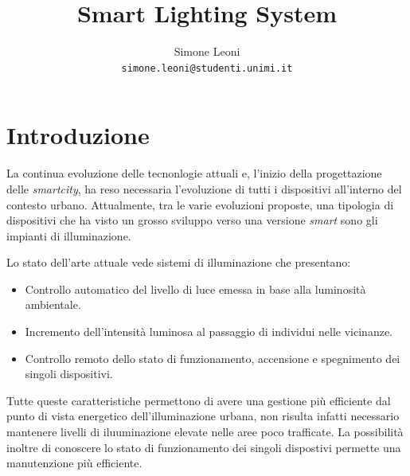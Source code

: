 \documentclass{article}
\title{Smart Lighting System}
\author{Simone Leoni \\
\footnotesize {\tt simone.leoni@studenti.unimi.it}}
\date{}
\begin{document}
	\maketitle
	
	\section{Introduzione}
	La continua evoluzione delle tecnonlogie attuali e, l'inizio della progettazione delle \textit{smartcity}, ha reso necessaria l'evoluzione di tutti i dispositivi all'interno del contesto urbano.
	Attualmente, tra le varie evoluzioni proposte, una tipologia di dispositivi che ha visto un grosso sviluppo verso una versione
	\textit{smart} sono gli impianti di illuminazione.
	
	\noindent Lo stato dell'arte attuale vede sistemi di illuminazione che presentano:
	\begin{itemize}
		\item Controllo automatico del livello di luce emessa in base alla luminosit\`a ambientale.
		\item Incremento dell'intensit\`a luminosa al passaggio di individui nelle vicinanze.
		\item Controllo remoto dello stato di funzionamento, accensione e spegnimento dei singoli dispositivi.
	\end{itemize}
	Tutte queste caratteristiche permettono di avere una gestione pi\`u efficiente dal punto di vista energetico dell'illuminazione
	urbana, non risulta infatti necessario mantenere livelli di iluuminazione elevate nelle aree poco trafficate.
	La possibilit\`a inoltre di conoscere lo stato di funzionamento dei singoli dispostivi permette una manutenzione pi\`u efficiente.
	
\end{document}
